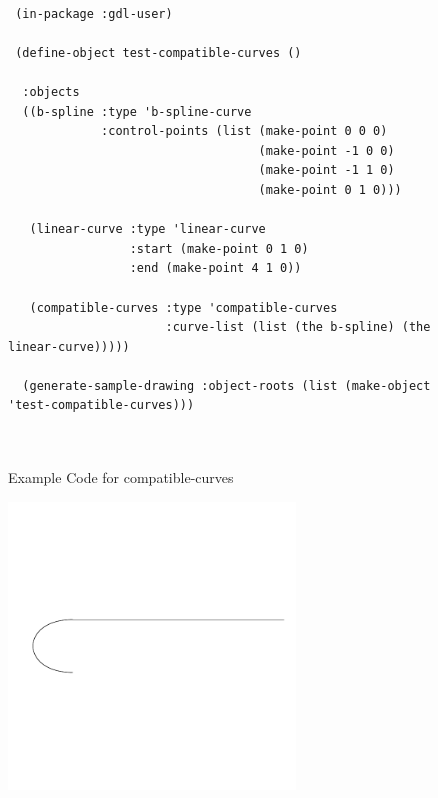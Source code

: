 \documentclass [11pt]{book}
\begin{document}
\begin{itemize}
\begin{figure}
\begin{lrbox}{\boxedverb}
\begin{minipage}{\linewidth}
{\small

\begin{verbatim}
 
 (in-package :gdl-user)

 (define-object test-compatible-curves ()
  
  :objects
  ((b-spline :type 'b-spline-curve
             :control-points (list (make-point 0 0 0)
                                   (make-point -1 0 0)
                                   (make-point -1 1 0)
                                   (make-point 0 1 0)))
   
   (linear-curve :type 'linear-curve
                 :start (make-point 0 1 0)
                 :end (make-point 4 1 0))
   
   (compatible-curves :type 'compatible-curves
                      :curve-list (list (the b-spline) (the linear-curve)))))

  (generate-sample-drawing :object-roots (list (make-object 'test-compatible-curves)))



\end{verbatim}}
\end{minipage}
\end{lrbox}
\fbox{\usebox{\boxedverb}}

\caption{Example Code for compatible-curves}

\label{fig:example-code-compatible-curves}

\end{figure}

\begin{figure}
\begin{center}
\includegraphics[width=3in,height=3in]{../images/example-compatible-curves.pdf}
\end{center}


\end{figure}
\end{itemize}
\end{document}

